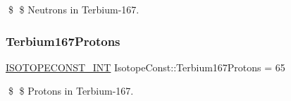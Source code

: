 \$ \$ Neutrons in Terbium-\/167. \mbox{\label{group___isotope_const-_terbium-_tb167_ga4ef09b011dd4e99cd30ad4a75e959347}} 
\subsubsection{\texorpdfstring{Terbium167\+Protons}{Terbium167Protons}}
{\footnotesize\ttfamily \mbox{\hyperlink{group___isotope_const-_macros_ga5f18360b3e99483a35c32d789e62621c}{I\+S\+O\+T\+O\+P\+E\+C\+O\+N\+S\+T\+\_\+\+I\+NT}} Isotope\+Const\+::\+Terbium167\+Protons = 65}

\$ \$ Protons in Terbium-\/167. 